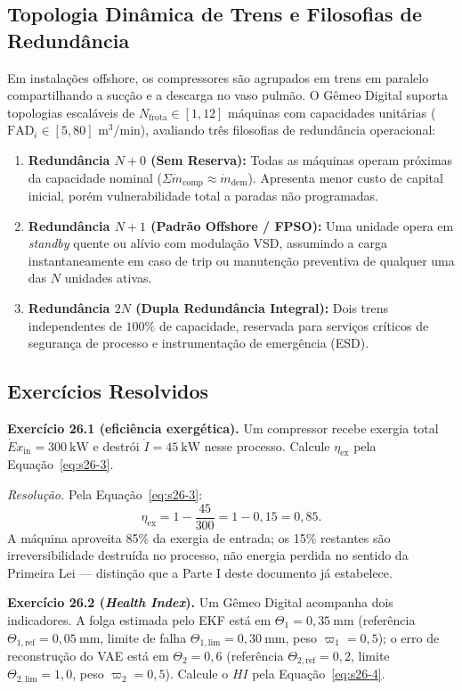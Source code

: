 \documentclass[12pt,a4paper]{article}
\numberwithin{equation}{section}
\numberwithin{table}{section}
\numberwithin{figure}{section}
\begin{document}
{	\subsection{Topologia Dinâmica de Trens e Filosofias de Redundância}
	Em instalações offshore, os compressores são agrupados em trens em paralelo compartilhando a sucção e a descarga no vaso pulmão. O Gêmeo Digital suporta topologias escaláveis de $N_{\text{frota}} \in [1, 12]$ máquinas com capacidades unitárias ($\text{FAD}_i \in [5, 80]\text{ m}^3/\text{min}$), avaliando três filosofias de redundância operacional:
	\begin{enumerate}
		\item \textbf{Redundância $N+0$ (Sem Reserva):} Todas as máquinas operam próximas da capacidade nominal ($\Sigma \dot{m}_{\text{comp}} \approx \dot{m}_{\text{dem}}$). Apresenta menor custo de capital inicial, porém vulnerabilidade total a paradas não programadas.
		\item \textbf{Redundância $N+1$ (Padrão Offshore / FPSO):} Uma unidade opera em \textit{standby} quente ou alívio com modulação VSD, assumindo a carga instantaneamente em caso de trip ou manutenção preventiva de qualquer uma das $N$ unidades ativas.
		\item \textbf{Redundância $2N$ (Dupla Redundância Integral):} Dois trens independentes de $100\%$ de capacidade, reservada para serviços críticos de segurança de processo e instrumentação de emergência (ESD).
	\end{enumerate}

	\subsection{Exercícios Resolvidos}

	\textbf{Exercício 26.1 (eficiência exergética).} Um compressor recebe
	exergia total $\dot{E}x_{\text{in}} = 300\ \mathrm{kW}$ e destrói
	$\dot{I} = 45\ \mathrm{kW}$ nesse processo. Calcule $\eta_{\text{ex}}$
	pela Equação~\eqref{eq:s26-3}.

	\emph{Resolução.} Pela Equação~\eqref{eq:s26-3}:
	$$\eta_{\text{ex}} = 1 - \frac{45}{300} = 1 - 0{,}15 = 0{,}85.$$
	A máquina aproveita 85\% da exergia de entrada; os 15\% restantes são
	irreversibilidade destruída no processo, não energia perdida no
	sentido da Primeira Lei --- distinção que a Parte I deste documento já
	estabelece.

	\textbf{Exercício 26.2 (\textit{Health Index}).} Um Gêmeo Digital
	acompanha dois indicadores. A folga estimada pelo EKF está em
	$\Theta_1 = 0{,}35\ \mathrm{mm}$ (referência
	$\Theta_{1,\text{ref}}=0{,}05\ \mathrm{mm}$, limite de falha
	$\Theta_{1,\text{lim}}=0{,}30\ \mathrm{mm}$, peso $\varpi_1=0{,}5$); o
	erro de reconstrução do VAE está em $\Theta_2 = 0{,}6$ (referência
	$\Theta_{2,\text{ref}}=0{,}2$, limite $\Theta_{2,\text{lim}}=1{,}0$,
	peso $\varpi_2=0{,}5$). Calcule o $HI$ pela Equação~\eqref{eq:s26-4}.

}
\end{document}
